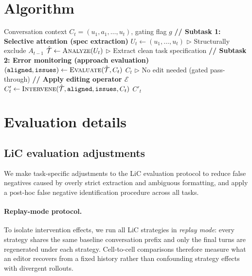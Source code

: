 \documentclass{article}
\newcommand{\methodfull}{Agentic Conversation Context Curation\xspace}
\newcommand{\method}{AC3\xspace}
\begin{document}




\appendix

\section{Algorithm}
\label{app:algorithm}

\begin{algorithm}[h]
\caption{\methodfull{} (\method)}
\label{alg:context-edit}
\begin{algorithmic}[1]
\REQUIRE Conversation context $C_t = (u_1, a_1, \ldots, u_t)$, gating flag $g$
\STATE \textbf{// Subtask 1: Selective attention (spec extraction)}
\STATE $U_t \leftarrow (u_1, \ldots, u_t)$ \hfill $\triangleright$ Structurally exclude $A_{t-1}$
\STATE $\hat{\mathcal{T}} \leftarrow \textsc{Analyze}(U_t)$ \hfill $\triangleright$ Extract clean task specification
\STATE \textbf{// Subtask 2: Error monitoring (approach evaluation)}
\STATE $(\texttt{aligned}, \texttt{issues}) \leftarrow \textsc{Evaluate}(\hat{\mathcal{T}}, C_t)$
    \RETURN $C_t$ \hfill $\triangleright$ No edit needed (gated pass-through)
\ENDIF
\STATE \textbf{// Apply editing operator $\mathcal{E}$}
\STATE $C'_t \leftarrow \textsc{Intervene}(\hat{\mathcal{T}}, \texttt{aligned}, \texttt{issues}, C_t)$
\RETURN $C'_t$
\end{algorithmic}
\end{algorithm}


\section{Evaluation details}
\label{app:eval-details}

\subsection{LiC evaluation adjustments}
\label{app:user-sim-qc}

We make task-specific adjustments to the LiC evaluation protocol to reduce false negatives caused by overly strict extraction and ambiguous formatting, and apply a post-hoc false negative identification procedure across all tasks.

\paragraph{Replay-mode protocol.} To isolate intervention effects, we run all LiC strategies in \emph{replay mode}: every strategy shares the same baseline conversation prefix and only the final turns are regenerated under each strategy. Cell-to-cell comparisons therefore measure what an editor recovers from a fixed history rather than confounding strategy effects with divergent rollouts.
\end{document}

